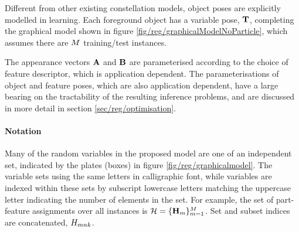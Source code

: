 Different from other existing constellation models, object poses are explicitly modelled in learning. Each foreground object has a variable pose, $\mathbf{T}$, completing the graphical model shown in figure \ref{fig/reg/graphicalModelNoParticle}, which assumes there are $M$ training/test instances. 

The appearance vectors $\mathbf{A}$ and $\mathbf{B}$ are parameterised according to the choice of feature descriptor, which is application dependent. The parameterisations of object and feature poses, which are also application dependent, have a large bearing on the tractability of the resulting inference problems, and are discussed in more detail in section \ref{sec/reg/optimisation}. 



\paragraph{Notation~} Many of the random variables in the proposed model are one of an independent set, indicated by the plates (boxes) in figure \ref{fig/reg/graphicalmodel}. The variable sets using the same letters in calligraphic font, while variables are indexed within these sets by subscript lowercase letters matching the uppercase letter indicating the number of elements in the set. For example, the set of part-feature assignments over all instances is $\mathcal{H} = \{\mathbf{H}_{m}\}_{m=1}^M$. Set and subset indices are concatenated, \eg ${H}_{mnk}$.

